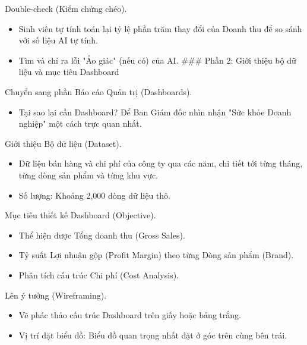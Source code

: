 \documentclass[aspectratio=169]{beamer}
\begin{document}
\begin{frame}{Double-check (Kiểm chứng chéo).}
    \begin{itemize}
        \item Sinh viên tự tính toán lại tỷ lệ phần trăm thay đổi của Doanh thu để so sánh với số liệu AI tự tính.
        \item Tìm và chỉ ra lỗi "Ảo giác" (nếu có) của AI.
        ### Phần 2: Giới thiệu bộ dữ liệu và mục tiêu Dashboard
    \end{itemize}
\end{frame}


\begin{frame}{Chuyển sang phần Báo cáo Quản trị (Dashboards).}
    \begin{itemize}
        \item Tại sao lại cần Dashboard? Để Ban Giám đốc nhìn nhận "Sức khỏe Doanh nghiệp" một cách trực quan nhất.
    \end{itemize}
\end{frame}


\begin{frame}{Giới thiệu Bộ dữ liệu (Dataset).}
    \begin{itemize}
        \item Dữ liệu bán hàng và chi phí của công ty qua các năm, chi tiết tới từng tháng, từng dòng sản phẩm và từng khu vực.
        \item Số lượng: Khoảng 2,000 dòng dữ liệu thô.
    \end{itemize}
\end{frame}


\begin{frame}{Mục tiêu thiết kế Dashboard (Objective).}
    \begin{itemize}
        \item Thể hiện được Tổng doanh thu (Gross Sales).
        \item Tỷ suất Lợi nhuận gộp (Profit Margin) theo từng Dòng sản phẩm (Brand).
        \item Phân tích cấu trúc Chi phí (Cost Analysis).
    \end{itemize}
\end{frame}


\begin{frame}{Lên ý tưởng (Wireframing).}
    \begin{itemize}
        \item Vẽ phác thảo cấu trúc Dashboard trên giấy hoặc bảng trắng.
        \item Vị trí đặt biểu đồ: Biểu đồ quan trọng nhất đặt ở góc trên cùng bên trái.
    \end{itemize}
\end{frame}
\end{document}
